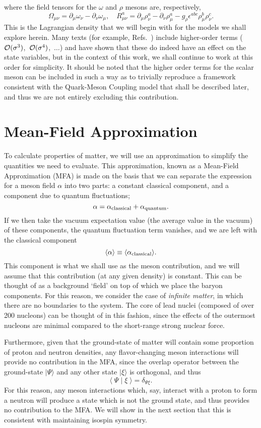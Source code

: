 \documentclass[11pt,a4paper,twoside]{carrollthesis}
\newcommand{\be}{\begin{equation}}
\newcommand{\ee}{\end{equation}}
\newcommand{\del}{\partial}
\newcommand{\bra}{\langle}
\newcommand{\ket}{\rangle}
\newcommand{\s}{\sigma}
\newcommand{\w}{\omega}
\begin{document}
%
where the field tensors for the $\w$ and $\rho$ mesons are,
respectively,
%
\be \Omega_{\mu\nu} = \del_\mu\w_\nu - \del_\nu\w_\mu, \quad
R^a_{\mu\nu} = \del_\mu\rho^a_\nu - \del_\nu\rho^a_\mu - g_\rho
\epsilon^{abc}\rho^b_\mu\rho^c_\nu.  \ee
%
This is the Lagrangian density that we will begin with for the models
we shall explore herein. Many texts (for example,
Refs.~\cite{Alaverdyan:2009kv,Greco:2000dt,Uechi:2006pz,Menezes:2002cq})
include higher-order terms (${\cal O}(\s^3)$,\ ${\cal
  O}(\s^4)$,\ $\ldots$) and have shown that these do indeed have an
effect on the state variables, but in the context of this work, we
shall continue to work at this order for simplicity. It should be
noted that the higher order terms for the scalar meson can be included
in such a way as to trivially reproduce a framework consistent with
the Quark-Meson Coupling model that shall be described later, and thus
we are not entirely excluding this contribution.\par
%

\section{Mean-Field Approximation}\label{sec:mfa}
%
To calculate properties of matter, we will use an approximation to
simplify the quantities we need to evaluate. This approximation, known
as a Mean-Field Approximation (MFA) is made on the basis that we can
separate the expression for a meson field $\alpha$ into two parts: a
constant classical component, and a component due to quantum
fluctuations;
%
\be \alpha = \alpha_{\rm classical} + \alpha_{\rm quantum}.  \ee
%
If we then take the vacuum expectation value (the average value in the
vacuum) of these components, the quantum fluctuation term vanishes,
and we are left with the classical component
%
\be \bra\alpha\ket \equiv \bra\alpha_{\rm classical}\ket.  \ee
%
This component is what we shall use as the meson contribution, and we
will assume that this contribution (at any given density) is
constant. This can be thought of as a background `field' on top of
which we place the baryon components. For this reason, we consider the
case of \emph{infinite matter}, in which there are no boundaries to
the system. The core of lead nuclei (composed of over 200 nucleons)
can be thought of in this fashion, since the effects of the outermost
nucleons are minimal compared to the short-range strong nuclear
force.\par
%
Furthermore, given that the ground-state of matter will contain some
proportion of proton and neutron densities, any flavor-changing meson
interactions will provide no contribution in the MFA, since the
overlap operator between the ground-state $|\Psi\ket$ and any other
state $|\xi\ket$ is orthogonal, and thus
%
\be
\label{eq:overlap}
\bra\; \Psi\; |\; \xi\; \ket = \delta_{\Psi\xi}.
\ee
%
For this reason, any meson interactions which, say, interact with a
proton to form a neutron will produce a state which is not the ground
state, and thus provides no contribution to the MFA. We will show in
the next section that this is consistent with maintaining isospin
symmetry.
\end{document}
